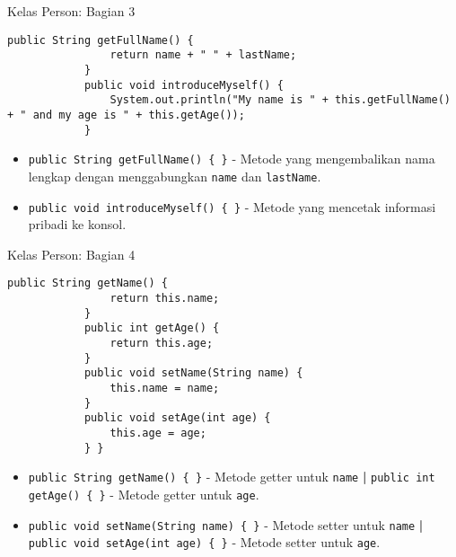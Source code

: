 \documentclass[aspectratio=169, table]{beamer}
\begin{document}
	\begin{frame}[fragile]{Kelas Person: Bagian 3}
		\begin{lstlisting}[style=JavaStyle]
			public String getFullName() {
				return name + " " + lastName;
			}	
			public void introduceMyself() {
				System.out.println("My name is " + this.getFullName() + " and my age is " + this.getAge());
			}
		\end{lstlisting}
		
		\begin{itemize}
			\item \texttt{public String getFullName() \{ \}} - Metode yang mengembalikan nama lengkap dengan menggabungkan \texttt{name} dan \texttt{lastName}.
			\item \texttt{public void introduceMyself() \{ \}} - Metode yang mencetak informasi pribadi ke konsol.
		\end{itemize}
	\end{frame}
	
	\begin{frame}[fragile]{Kelas Person: Bagian 4}
	\vspace{10pt}
		\begin{lstlisting}[style=JavaStyle]
			public String getName() {
				return this.name;
			}
			public int getAge() {
				return this.age;
			}	
			public void setName(String name) {
				this.name = name;
			}
			public void setAge(int age) {
				this.age = age;
			} }
	\end{lstlisting}
	\begin{itemize}
		\item \texttt{public String getName() \{ \}} - Metode getter untuk \texttt{name} \textbf{ | } \texttt{public int getAge() \{ \}} - Metode getter untuk \texttt{age}.
		\item \texttt{public void setName(String name) \{ \}} - Metode setter untuk \texttt{name} \textbf{ | }  \texttt{public void setAge(int age) \{ \}} - Metode setter untuk \texttt{age}.
	\end{itemize}
\end{frame}
\end{document}
